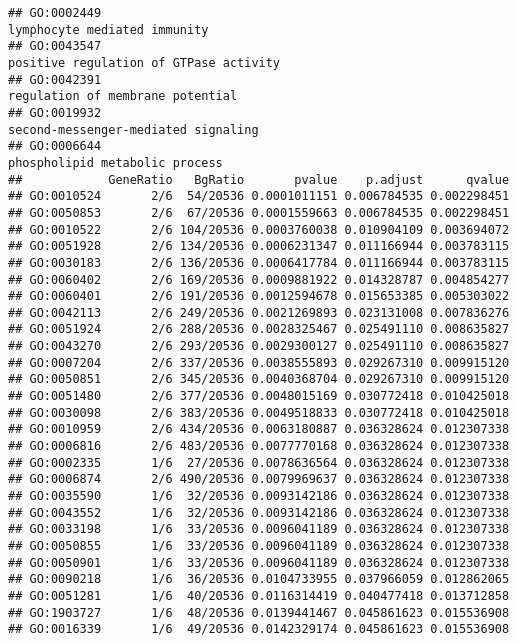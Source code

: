 \documentclass[
]{article}
\begin{document}
\begin{verbatim}
## GO:0002449                                                                                              lymphocyte mediated immunity
## GO:0043547                                                                                    positive regulation of GTPase activity
## GO:0042391                                                                                          regulation of membrane potential
## GO:0019932                                                                                       second-messenger-mediated signaling
## GO:0006644                                                                                            phospholipid metabolic process
##            GeneRatio   BgRatio       pvalue    p.adjust      qvalue
## GO:0010524       2/6  54/20536 0.0001011151 0.006784535 0.002298451
## GO:0050853       2/6  67/20536 0.0001559663 0.006784535 0.002298451
## GO:0010522       2/6 104/20536 0.0003760038 0.010904109 0.003694072
## GO:0051928       2/6 134/20536 0.0006231347 0.011166944 0.003783115
## GO:0030183       2/6 136/20536 0.0006417784 0.011166944 0.003783115
## GO:0060402       2/6 169/20536 0.0009881922 0.014328787 0.004854277
## GO:0060401       2/6 191/20536 0.0012594678 0.015653385 0.005303022
## GO:0042113       2/6 249/20536 0.0021269893 0.023131008 0.007836276
## GO:0051924       2/6 288/20536 0.0028325467 0.025491110 0.008635827
## GO:0043270       2/6 293/20536 0.0029300127 0.025491110 0.008635827
## GO:0007204       2/6 337/20536 0.0038555893 0.029267310 0.009915120
## GO:0050851       2/6 345/20536 0.0040368704 0.029267310 0.009915120
## GO:0051480       2/6 377/20536 0.0048015169 0.030772418 0.010425018
## GO:0030098       2/6 383/20536 0.0049518833 0.030772418 0.010425018
## GO:0010959       2/6 434/20536 0.0063180887 0.036328624 0.012307338
## GO:0006816       2/6 483/20536 0.0077770168 0.036328624 0.012307338
## GO:0002335       1/6  27/20536 0.0078636564 0.036328624 0.012307338
## GO:0006874       2/6 490/20536 0.0079969637 0.036328624 0.012307338
## GO:0035590       1/6  32/20536 0.0093142186 0.036328624 0.012307338
## GO:0043552       1/6  32/20536 0.0093142186 0.036328624 0.012307338
## GO:0033198       1/6  33/20536 0.0096041189 0.036328624 0.012307338
## GO:0050855       1/6  33/20536 0.0096041189 0.036328624 0.012307338
## GO:0050901       1/6  33/20536 0.0096041189 0.036328624 0.012307338
## GO:0090218       1/6  36/20536 0.0104733955 0.037966059 0.012862065
## GO:0051281       1/6  40/20536 0.0116314419 0.040477418 0.013712858
## GO:1903727       1/6  48/20536 0.0139441467 0.045861623 0.015536908
## GO:0016339       1/6  49/20536 0.0142329174 0.045861623 0.015536908

\end{verbatim}
\end{document}
